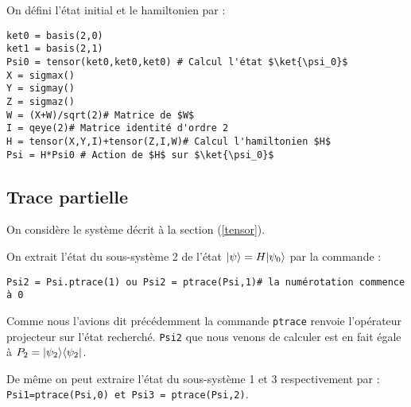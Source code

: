 \begin{itemize}
On défini l'état initial et le hamiltonien par :\\
\begin{lstlisting}
ket0 = basis(2,0)
ket1 = basis(2,1)
Psi0 = tensor(ket0,ket0,ket0) # Calcul l'état $\ket{\psi_0}$
X = sigmax()
Y = sigmay()
Z = sigmaz()
W = (X+W)/sqrt(2)# Matrice de $W$
I = qeye(2)# Matrice identité d'ordre 2
H = tensor(X,Y,I)+tensor(Z,I,W)# Calcul l'hamiltonien $H$
Psi = H*Psi0 # Action de $H$ sur $\ket{\psi_0}$
\end{lstlisting}


\subsection{Trace partielle}

On considère le système décrit à la section (\ref{tensor}).

On extrait l'état du sous-système 2 de l'état $\vert\psi\rangle=H\vert\psi_0\rangle$ par la 
commande :\\
\begin{lstlisting}
Psi2 = Psi.ptrace(1) ou Psi2 = ptrace(Psi,1)# la numérotation commence à 0
\end{lstlisting}
Comme nous l'avions dit précédemment la commande \texttt{ptrace} renvoie 
l'opérateur projecteur sur l'état recherché. \texttt{Psi2} que nous venons de 
calculer est en fait égale à $P_2=\vert\psi_2\rangle\langle\psi_2\vert$.

De même on peut extraire l'état du sous-système 1 et 3 respectivement par :\\ 
\texttt{Psi1=ptrace(Psi,0) et Psi3 = ptrace(Psi,2)}.


\end{itemize}
